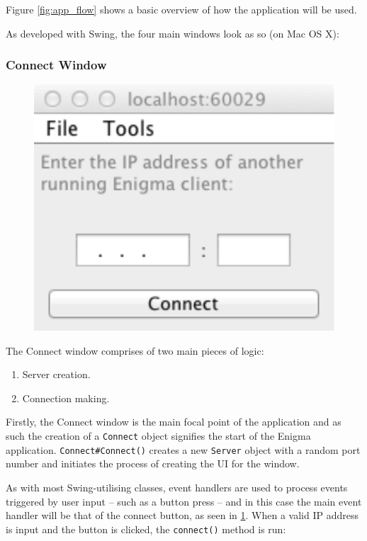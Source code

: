     Figure \ref{fig:app_flow} shows a basic overview of how the application will be used.
    
    As developed with Swing, the four main windows look as so (on Mac OS X):
    
    \subsubsection{Connect Window}
    
    \begin{figure}
      \centering
      \includegraphics[scale=0.7]{./Figures/Ch6/6-3-1-2-connect_window.pdf}
      \label{fig:connect_window}
    \end{figure}
    
    The Connect window comprises of two main pieces of logic:
    
    \begin{enumerate}
      \item Server creation.
      \item Connection making.
    \end{enumerate}
    
    Firstly, the Connect window is the main focal point of the application and as such the creation of a \verb!Connect! object signifies the start of the Enigma application. \verb!Connect#Connect()! creates a new \verb!Server! object with a random port number and initiates the process of creating the UI for the window.
    
    As with most Swing-utilising classes, event handlers are used to process events triggered by user input -- such as a button press -- and in this case the main event handler will be that of the connect button, as seen in \ref{fig:connect_window}. When a valid IP address is input and the button is clicked, the \verb!connect()! method is run:
    
